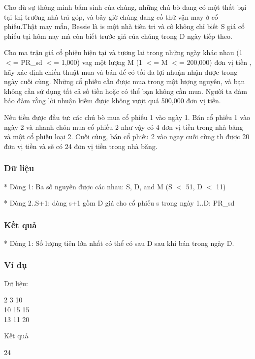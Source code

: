 



   Cho dù sự thông minh bẩm sinh của chúng, những chú bò đang có một thất  bại tại thị trường nhà trả góp, và bây giờ chúng đang cố thử vận may ở  cổ phiếu.Thật may mắn, Bessie là is một nhà tiên tri và cô không chỉ biết  S giá cổ phiếu tại hôm nay mà còn biết trước giá của chúng trong D ngày  tiếp theo.  

   Cho ma trận giá cổ phiệu hiện tại và tương lai trong những ngày khác nhau  (1 $<$= PR\_sd $<$= 1,000) vag một lượng M (1 $<$= M $<$= 200,000) đơn vị tiền , hãy xác định chiến thuật mua và bán để có tối đa lợi nhuận nhận được trong  ngày cuối cùng. Những cổ phiếu cần được mua trong một lượng nguyên, và bạn  không cần sử dụng tất cả số tiền hoặc có thể bạn không cần mua. Người ta  đảm bảo đảm rằng lời nhuận kiếm được không vượt quá 500,000 đơn vị tiền.  

   Nếu tiền được đầu tư: các chú bò mua cổ phiếu 1 vào ngày 1. Bán cổ phiếu  1 vào ngày 2 và nhanh chón mua cổ phiếu 2 như vậy có 4 đơn vị tiền trong  nhà băng và một cổ phiếu loại 2. Cuối cùng, bán cổ phiếu 2 vào ngay cuối  cùng th được 20 đơn vị tiền và sẽ có 24 đơn vị tiền trong nhà băng.  

\subsubsection{   Dữ liệu  }

   * Dòng 1: Ba số nguyên được các nhau: S, D, and M (S $<$ 51, D $<$ 11)  

   * Dòng 2..S+1: dòng s+1 gồm D giá cho cổ phiếu s trong ngày 1..D: PR\_sd  

\subsubsection{   Kết quả  }

   * Dòng 1: Số lượng tiên lớn nhất có thể có sau D sau khi bán trong ngày D.  

\subsubsection{   Ví dụ  }

   Dữ liệu:  

   2 3 10   
\\   10 15 15   
\\   13 11 20  



   Kết quả  

   24  